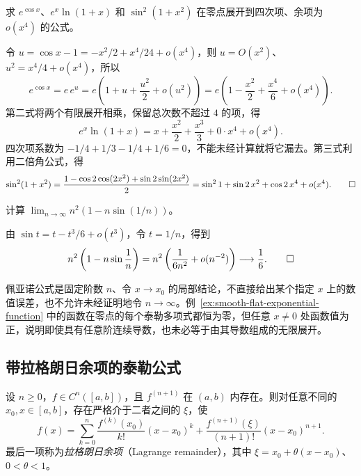 \documentclass[UTF8,12pt,a4paper,fontset=fandol]{ctexbook}
\begin{document}
\begin{example}
\label{ex:taylor-composition-and-product}
求 $e^{\cos x}$、$e^x\ln(1+x)$ 和 $\sin^2(1+x^2)$ 在零点展开到四次项、余项为 $o(x^4)$ 的公式。
\end{example}

\begin{solve}
令 $u=\cos x-1=-x^2/2+x^4/24+o(x^4)$，则 $u=O(x^2)$、$u^2=x^4/4+o(x^4)$，所以
\[
    e^{\cos x}=e\,e^u
    =e\left(1+u+\frac{u^2}{2}+o(u^2)\right)
    =e\left(1-\frac{x^2}{2}+\frac{x^4}{6}+o(x^4)\right).
\]
第二式将两个有限展开相乘，保留总次数不超过 $4$ 的项，得
\[
    e^x\ln(1+x)=x+\frac{x^2}{2}+\frac{x^3}{3}+0\cdot x^4+o(x^4).
\]
四次项系数为 $-1/4+1/3-1/4+1/6=0$，不能未经计算就将它漏去。第三式利用二倍角公式，得
\[
    \sin^2(1+x^2)
    =\frac{1-\cos2\cos(2x^2)+\sin2\sin(2x^2)}2
    =\sin^21+\sin2\,x^2+\cos2\,x^4+o(x^4).
    \qedhere
\]
\end{solve}

\begin{example}
\label{ex:taylor-peano-sequence-limit}
计算 $\lim_{n\to\infty}n^2(1-n\sin(1/n))$。
\end{example}

\begin{solve}
由 $\sin t=t-t^3/6+o(t^3)$，令 $t=1/n$，得到
\[
    n^2\left(1-n\sin\frac1n\right)
    =n^2\left(\frac1{6n^2}+o(n^{-2})\right)\longrightarrow\frac16.
    \qedhere
\]
\end{solve}

佩亚诺公式是固定阶数 $n$、令 $x\to x_0$ 的局部结论，不直接给出某个指定 $x$ 上的数值误差，也不允许未经证明地令 $n\to\infty$。例~\ref{ex:smooth-flat-exponential-function} 中的函数在零点的每个泰勒多项式都恒为零，但任意 $x\neq0$ 处函数值为正，说明即使具有任意阶连续导数，也未必等于由其导数组成的无限展开。

\subsection{带拉格朗日余项的泰勒公式}
\label{subsec:taylor-formula-with-lagrange-remainder}

\begin{theorem}[带拉格朗日余项的泰勒公式]
\label{thm:taylor-lagrange}
设 $n\geq0$，$f\in C^n([a,b])$，且 $f^{(n+1)}$ 在 $(a,b)$ 内存在。则对任意不同的 $x_0,x\in[a,b]$，存在严格介于二者之间的 $\xi$，使
\begin{equation}
    f(x)=\sum_{k=0}^n\frac{f^{(k)}(x_0)}{k!}(x-x_0)^k
       +\frac{f^{(n+1)}(\xi)}{(n+1)!}(x-x_0)^{n+1}.
    \label{eq:taylor-lagrange}
\end{equation}
最后一项称为\emph{拉格朗日余项}（Lagrange remainder），其中 $\xi=x_0+\theta(x-x_0)$、$0<\theta<1$。
\end{theorem}
\end{document}

